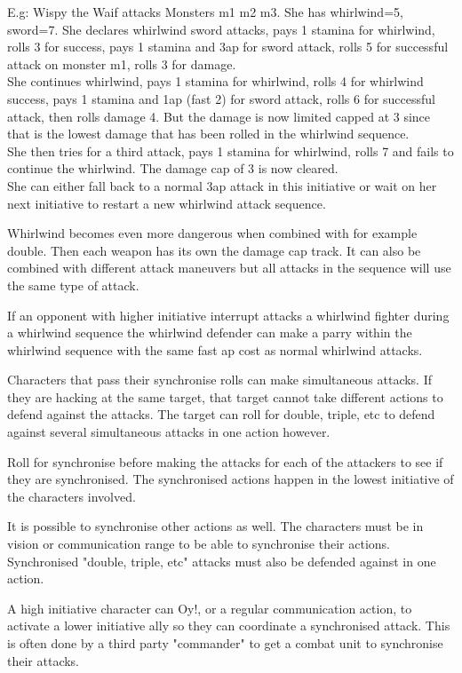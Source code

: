 E.g: Wispy the Waif attacks Monsters m1 m2 m3. She has whirlwind=5, sword=7.
She declares whirlwind sword attacks,
pays 1 stamina for whirlwind, rolls 3 for success, pays 1 stamina and 3ap for sword attack, rolls 5 for successful attack on monster m1, rolls 3 for damage. \\
She continues whirlwind, pays 1 stamina for whirlwind, rolls 4 for whirlwind success, pays 1 stamina and 1ap (fast 2) for sword attack, rolls 6 for successful attack, then rolls damage 4. But the damage is now limited capped at 3 since that is the lowest damage that has been rolled in the whirlwind sequence. \\
She then tries for a third attack, pays 1 stamina for whirlwind, rolls 7 and fails to continue the whirlwind. The damage cap of 3 is now cleared. \\
She can either fall back to a normal 3ap attack in this initiative or wait on her next initiative to restart a new whirlwind attack sequence.

Whirlwind becomes even more dangerous when combined with for example double. Then each weapon has its own the damage cap track. It can also be combined with different attack maneuvers but all attacks in the sequence will use the same type of attack.

If an opponent with higher initiative interrupt attacks a whirlwind fighter during a whirlwind sequence the whirlwind defender can make a parry within the whirlwind sequence with the same fast ap cost as normal whirlwind attacks.


 Characters that pass their synchronise rolls can make simultaneous attacks. If they are hacking at the same target, that target cannot take different actions to defend against the attacks. The target can roll for double, triple, etc to defend against several simultaneous attacks in one action however.

Roll for synchronise before making the attacks for each of the attackers to see if they are synchronised. The synchronised actions happen in the lowest initiative of the characters involved.

It is possible to synchronise other actions as well. The characters must be in vision or communication range to be able to synchronise their actions.
Synchronised "double, triple, etc" attacks must also be defended against in one action.

A high initiative character can Oy!, or a regular communication action, to activate a lower initiative ally so they can coordinate a synchronised attack. This is often done by a third party "commander" to get a combat unit to synchronise their attacks.


